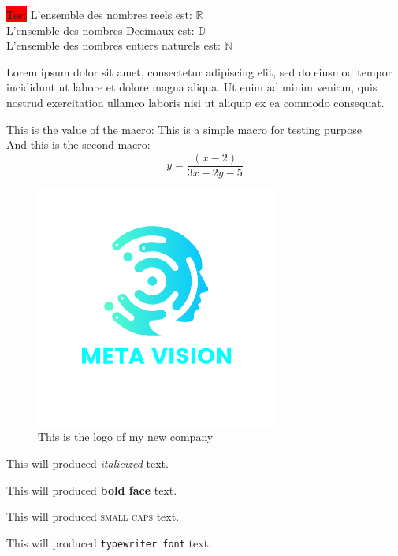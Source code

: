 \documentclass[12pt, a4paper]{article}
\def\makro1{This is a simple macro for testing purpose}
\def\eq1{y = \frac{(x-2)}{3x-2y-5}}
\newcommand\shortlorem{Lorem ipsum dolor sit amet, consectetur adipiscing elit, sed do eiusmod tempor incididunt ut labore et dolore magna aliqua. Ut enim ad minim veniam, quis nostrud exercitation ullamco laboris nisi ut aliquip ex ea commodo consequat.}
\begin{document}
\maketitle

\pagebreak
\tableofcontents

\pagebreak

\colorbox{red}{Test}
L'ensemble des nombres reels est: $\mathbb{R}$ \\
L'ensemble des nombres Decimaux est: $\mathbb{D}$ \\
L'ensemble des nombres entiers naturels est: $\mathbb{N}$

\vspace{1cm}
\shortlorem
\vspace{1cm}

This is the value of the macro: \makro1\\
And this is the second macro: $$\eq1$$

\begin{figure}[h]
        \centering
        \includegraphics[]{logo}
        \caption{This is the logo of my new company}

\end{figure}

\pagebreak


This will produced \textit{italicized} text.

This will produced \textbf{bold face} text.

This will produced \textsc{small caps} text.

This will produced \texttt{typewriter font} text.
\end{document}
